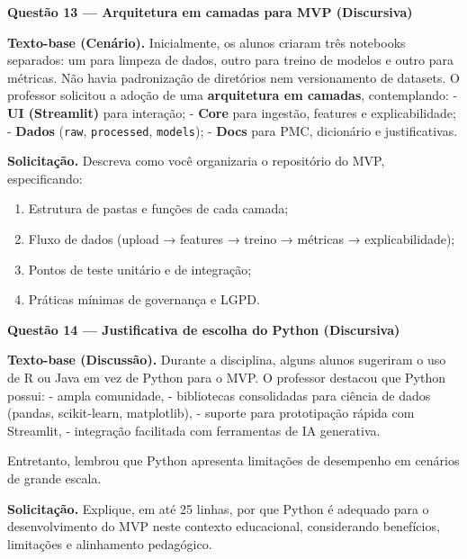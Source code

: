 \documentclass[12pt,a4paper]{article}
\begin{document}
\vfill

\newpage
\noindent\textbf{Questão 13 — Arquitetura em camadas para MVP (Discursiva)}  
\par\noindent\textbf{Texto-base (Cenário).}  
Inicialmente, os alunos criaram três notebooks separados: um para limpeza de dados, outro para treino de modelos e outro para métricas. Não havia padronização de diretórios nem versionamento de datasets. O professor solicitou a adoção de uma \textbf{arquitetura em camadas}, contemplando:  
- \textbf{UI (Streamlit)} para interação;  
- \textbf{Core} para ingestão, features e explicabilidade;  
- \textbf{Dados} (\texttt{raw}, \texttt{processed}, \texttt{models});  
- \textbf{Docs} para PMC, dicionário e justificativas.  

\noindent\textbf{Solicitação.}  
Descreva como você organizaria o repositório do MVP, especificando:  
\begin{enumerate}[label=\roman*)]
\item Estrutura de pastas e funções de cada camada;  
\item Fluxo de dados (upload → features → treino → métricas → explicabilidade);  
\item Pontos de teste unitário e de integração;  
\item Práticas mínimas de governança e LGPD.  
\end{enumerate}


\newpage
\noindent\textbf{Questão 14 — Justificativa de escolha do Python (Discursiva)}  
\par\noindent\textbf{Texto-base (Discussão).}  
Durante a disciplina, alguns alunos sugeriram o uso de R ou Java em vez de Python para o MVP. O professor destacou que Python possui:  
- ampla comunidade,  
- bibliotecas consolidadas para ciência de dados (pandas, scikit-learn, matplotlib),  
- suporte para prototipação rápida com Streamlit,  
- integração facilitada com ferramentas de IA generativa.  

Entretanto, lembrou que Python apresenta limitações de desempenho em cenários de grande escala.  

\noindent\textbf{Solicitação.}  
Explique, em até 25 linhas, por que Python é adequado para o desenvolvimento do MVP neste contexto educacional, considerando benefícios, limitações e alinhamento pedagógico.
\end{document}
